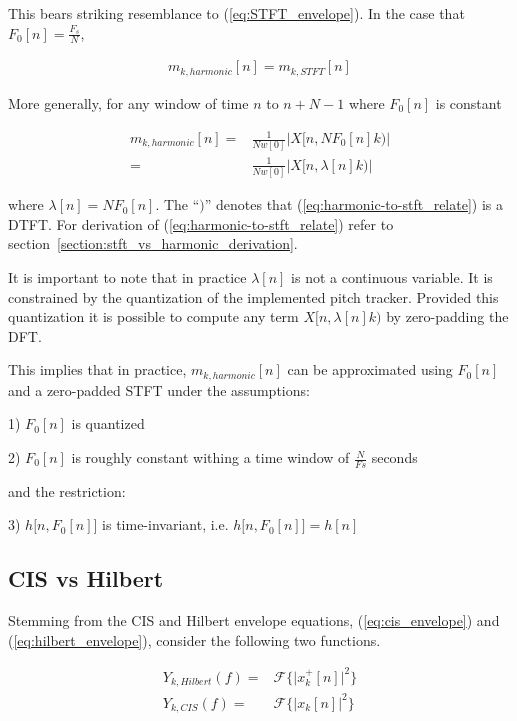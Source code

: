 \documentclass [11pt, proquest,oneside] {ganter_thesis}[2015/03/03]
\begin{document}
This bears striking resemblance to (\ref{eq:STFT_envelope}).  In the case that $F_0[n] = \frac{F_s}{N}$,

\begin{align}
m_{k,harmonic}[n] = m_{k,STFT}[n]
\end{align}

More generally, for any window of time $n$ to $n + N - 1$ where $F_0[n]$ is constant

\begin{align}
%
%
%
m_{k,harmonic}[n] =& \frac{1}{Nw[0]} \Big| X[n, N F_0[n] k) \Big| \nonumber \\
%
\label{eq:harmonic-to-stft_relate}
=& \frac{1}{Nw[0]} \Big| X[n, \lambda[n]k) \Big|
\end{align}

where $\lambda[n] = N F_0[n] $.  The ``$)$'' denotes that (\ref{eq:harmonic-to-stft_relate}) is a DTFT.  For derivation of (\ref{eq:harmonic-to-stft_relate}) refer to section~\ref{section:stft_vs_harmonic_derivation}.

It is important to note that in practice $\lambda[n]$ is not a continuous variable.  It is constrained by the quantization of the implemented pitch tracker.  Provided this quantization it is possible to compute any term $X[n, \lambda[n]k)$ by zero-padding the DFT.

This implies that in practice, $m_{k,harmonic}[n]$ can be approximated using $F_0[n]$ and a zero-padded STFT under the assumptions:

1) $F_0[n]$ is quantized

2) $F_0[n]$ is roughly constant withing a time window of $\frac{N}{Fs}$ seconds

and the restriction:

3) $h\Big[n, F_0[n] \Big]$ is time-invariant, i.e. $h\Big[n, F_0[n] \Big] = h[n]$

\subsection{CIS vs Hilbert}

Stemming from the CIS and Hilbert envelope equations, (\ref{eq:cis_envelope}) and (\ref{eq:hilbert_envelope}), consider the following two functions.

\begin{align}
\label{eq:hilbert_squared}
Y_{k,Hilbert}(f) =& \mathcal{F}\Big\{ \Big| x^+_k[n] \Big|^2  \Big\} \\
\label{eq:cis_squared_prefilter}
Y_{k,CIS}(f) =& \mathcal{F}\Big\{ \Big| x_k[n] \Big|^2  \Big\}
\end{align}
\end{document}
